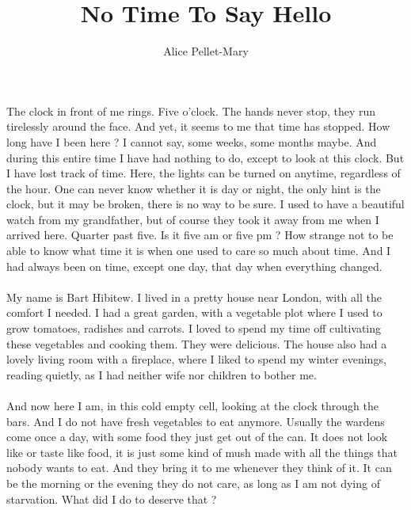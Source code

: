 \documentclass[a4paper]{article}
\author{Alice {\sc Pellet-Mary}}
\title{No Time To Say Hello}
\begin{document}
\maketitle

The clock in front of me rings. Five o'clock. The hands never stop, they run tirelessly around the face. And yet, it seems to me that time has stopped. How long have I been here ? I cannot say, some weeks, some months maybe. And during this entire time I have had nothing to do, except to look at this clock. But I have lost track of time. Here, the lights can be turned on anytime, regardless of the hour. One can never know whether it is day or night, the only hint is the clock, but it may be broken, there is no way to be sure. I used to have a beautiful watch from my grandfather, but of course they took it away from me when I arrived here. Quarter past five. Is it five am or five pm ? How strange not to be able to know what time it is when one used to care so much about time. And I had always been on time, except one day, that day when everything changed.
\\
\\
My name is Bart Hibitew. I lived in a pretty house near London, with all the comfort I needed. I had a great garden, with a vegetable plot where I used to grow tomatoes, radishes and carrots. I loved to spend my time off cultivating these vegetables and cooking them. They were delicious. The house also had a lovely living room with a fireplace, where I liked to spend my winter evenings, reading quietly, as I had neither wife nor children to bother me.\\
\\
And now here I am, in this cold empty cell, looking at the clock through the bars. And I do not have fresh vegetables to eat anymore. Usually the wardens come once a day, with some food they just get out of the can. It does not look like or taste like food, it is just some kind of mush made with all the things that nobody wants to eat. And they bring it to me whenever they think of it. It can be the morning or the evening they do not care, as long as I am not dying of starvation. What did I do to deserve that ?\\
\\
\end{document}
